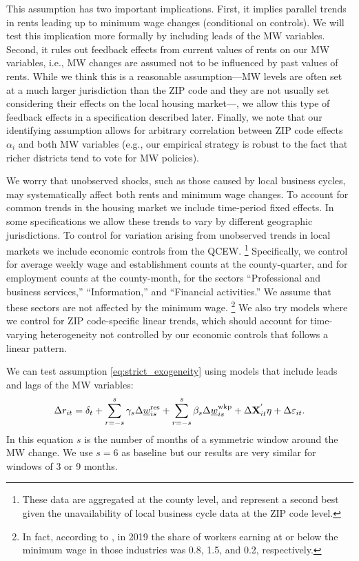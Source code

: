 This assumption has two important implications.
First,
it implies parallel trends in rents leading up to minimum wage changes 
(conditional on controls). We will test this implication more formally by 
including leads of the MW variables.
Second,
it rules out feedback effects from current values of rents on our MW variables, 
i.e., MW changes are assumed not to be influenced by past values of rents.
While we think this is a reasonable assumption---MW levels are often set at a 
much larger jurisdiction than the ZIP code and they are not usually
set considering their effects on the local housing market---, we allow this type of 
feedback effects in a specification described later.
Finally, we note that our identifying assumption allows for arbitrary 
correlation between ZIP code effects $\alpha_i$ and both MW variables
(e.g., our empirical strategy is robust to the fact that richer districts tend 
to vote for MW policies).

We worry that unobserved shocks, such as those caused by local business cycles, 
may systematically affect both rents and minimum wage changes.
To account for common trends in the housing market we include time-period 
fixed effects.
In some specifications we allow these trends to vary by different geographic 
jurisdictions. To control for variation arising from unobserved trends in local 
markets we include economic controls from the QCEW.%
\footnote{These data are aggregated at the county level, and represent a second 
best given the unavailability of local business cycle data at the ZIP code level.}
Specifically, we control for average weekly wage and establishment counts at the 
county-quarter, and for employment counts at the county-month, for the sectors 
``Professional and business services,'' ``Information,'' and 
``Financial activities.''
We assume that these sectors are not affected by the minimum wage.%
\footnote{In fact, according to \textcite[][table 5]{MinWorkersReportBLS}, in 
2019 the share of workers earning at or below the minimum wage in those 
industries was 0.8, 1.5, and 0.2, respectively.}
We also try models where we control for ZIP code-specific linear
trends, which should account for time-varying heterogeneity not controlled by 
our economic controls that follows a linear pattern.

We can test assumption \eqref{eq:strict_exogeneity} using models that include 
leads and lags of the MW variables:
\begin{equation} \label{eq:fd_leads_lags}
    \Delta r_{it} = \delta_t
                  + \sum_{r=-s}^{s} \gamma_s \Delta \underline{w}^{\text{res}}_{is} 
                  + \sum_{r=-s}^{s} \beta_s \Delta \underline{w}^{\text{wkp}}_{is}
                  + \Delta \mathbf{X}^{'}_{it}\eta
                  + \Delta \varepsilon_{it} .
\end{equation}
In this equation $s$ is the number of months of a symmetric window around the 
MW change.
We use $s=6$ as baseline but our results are very similar for windows of 3 or 9 
months.

